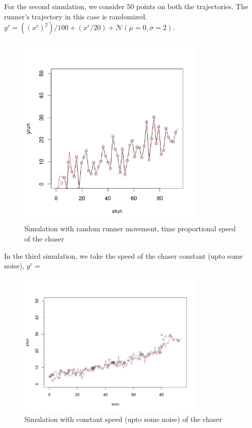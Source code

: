 \documentclass[a4paper,11pt]{article}
\begin{document}
For the second simulation, we consider 50 points on both the trajectories. The runner's trajectory in this case is randomized. $y^{r} = ((x^{r})^2)/100 + (x^{r}/20) + \mathcal{N}(\mu = 0, \sigma = 2)$.
\begin{figure}[H]
\centering
\includegraphics[width=0.8\textwidth]{sim50points.jpeg}
\caption{Simulation with random runner movement, time proportional speed of the chaser}
\end{figure}

In the third simulation, we take the speed of the chaser constant (upto some noise), $y^{c} = $
\begin{figure}[H]
\centering
\includegraphics[width=0.8\textwidth]{sim100points_randomizedtraj.jpeg}
\caption{Simulation with constant speed (upto some noise) of the chaser}
\end{figure}
\end{document}
